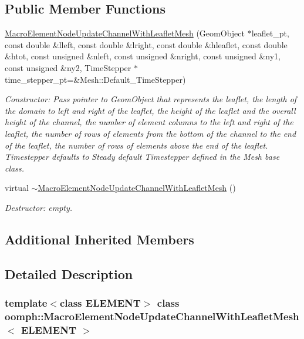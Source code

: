 \subsection*{Public Member Functions}
\begin{DoxyCompactItemize}
\item 
\hyperlink{classoomph_1_1MacroElementNodeUpdateChannelWithLeafletMesh_a8b2ddfc283a8f1ff6927c7a0c7f0ed21}{Macro\+Element\+Node\+Update\+Channel\+With\+Leaflet\+Mesh} (Geom\+Object $\ast$leaflet\+\_\+pt, const double \&lleft, const double \&lright, const double \&hleaflet, const double \&htot, const unsigned \&nleft, const unsigned \&nright, const unsigned \&ny1, const unsigned \&ny2, Time\+Stepper $\ast$time\+\_\+stepper\+\_\+pt=\&Mesh\+::\+Default\+\_\+\+Time\+Stepper)
\begin{DoxyCompactList}\small\item\em Constructor\+: Pass pointer to Geom\+Object that represents the leaflet, the length of the domain to left and right of the leaflet, the height of the leaflet and the overall height of the channel, the number of element columns to the left and right of the leaflet, the number of rows of elements from the bottom of the channel to the end of the leaflet, the number of rows of elements above the end of the leaflet. Timestepper defaults to Steady default Timestepper defined in the Mesh base class. \end{DoxyCompactList}\item 
virtual \hyperlink{classoomph_1_1MacroElementNodeUpdateChannelWithLeafletMesh_a5debbfa68133a5ad9bd621b24b2fd086}{$\sim$\+Macro\+Element\+Node\+Update\+Channel\+With\+Leaflet\+Mesh} ()
\begin{DoxyCompactList}\small\item\em Destructor\+: empty. \end{DoxyCompactList}\end{DoxyCompactItemize}
\subsection*{Additional Inherited Members}


\subsection{Detailed Description}
\subsubsection*{template$<$class E\+L\+E\+M\+E\+NT$>$\newline
class oomph\+::\+Macro\+Element\+Node\+Update\+Channel\+With\+Leaflet\+Mesh$<$ E\+L\+E\+M\+E\+N\+T $>$}

